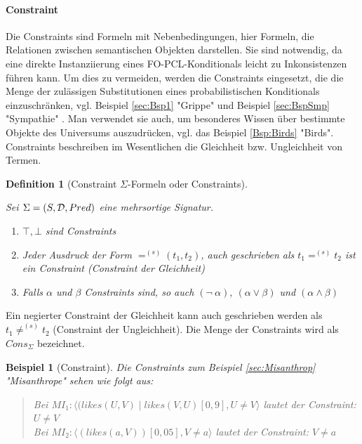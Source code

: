 \documentclass[a4paper, 11pt]{book}
\newtheorem{Def}{Definition }[section]
\newtheorem{Bsp}{Beispiel}[section]
\begin{document}
\paragraph{Constraint}  \label{constraint}

Die Constraints  sind Formeln mit Nebenbedingungen, hier Formeln, die Relationen zwischen semantischen Objekten darstellen. Sie sind notwendig, da eine direkte Instanziierung eines FO-PCL-Konditionals  leicht zu Inkonsistenzen führen kann. Um dies zu vermeiden, werden die Constraints eingesetzt, die die Menge der zulässigen Substitutionen eines probabilistischen Konditionals  einzuschränken, vgl. Beispiel \ref{sec:Bsp1} "{}Grippe"{}  und Beispiel \ref{sec:BspSmp} "{}Sympathie"{} . Man verwendet sie auch, um besonderes Wissen über bestimmte Objekte des Universums auszudrücken, vgl. das Beispiel \ref{Bsp:Birds} "{}Birds"{}.
Constraints beschreiben im Wesentlichen die Gleichheit bzw. Ungleichheit von Termen.

\begin{Def}[Constraint $ \Sigma $-Formeln oder Constraints]\cite[Kap. 6.2, S. 126/127 vgl. Def. 6.2.4]{Fis10} \label{Def:Constraint}
		
\noindent
Sei $ \Sigma = (S, {\cal D}, Pred) $ eine mehrsortige Signatur.
\begin{enumerate}
\renewcommand{\labelenumi}{\textnormal{(\theenumi)}}
\item {$ \top, \bot $ sind  Constraints}
\item {Jeder Ausdruck der Form $ =^{(s)} (t_1, t_2)$, auch geschrieben als $ t_1 =^{(s)} t_2 $} ist ein Constraint (Constraint der Gleichheit)
\item{Falls $ \alpha $ und $ \beta $ Constraints sind, so auch $  (\neg ~ \alpha),~  (\alpha \vee \beta)$ und $ (\alpha \wedge \beta)  $} 
\end{enumerate}
\end{Def}
Ein negierter Constraint der Gleichheit kann auch geschrieben werden als $ t_1 \not=^{(s)} t_2 $ (Constraint der Ungleichheit). 
Die Menge der Constraints wird als $ Cons_{\Sigma} $  bezeichnet.


\begin{Bsp}[Constraint] \label{Bsp:Constraint}
	Die Constraints zum Beispiel \ref{sec:Misanthrop} "{}Misanthrope"{} sehen wie folgt aus:\\
	\begin{quote}
	Bei	$ MI_1 : \langle (likes(U, V) \mid likes(V, U)[0,9], U \neq V \rangle$ lautet der Constraint: $  U \neq V  $\\
	Bei	$ MI_2 : \langle (likes(a, V))[0,05], V \neq a \rangle$ lautet der Constraint: $  V \neq a  $\\
	\end{quote}
\end{Bsp}
\end{document}
